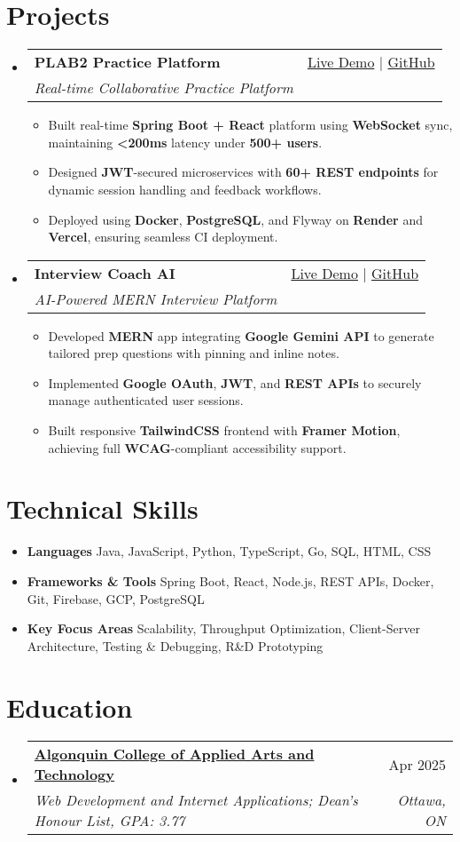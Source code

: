 \documentclass[letterpaper,11pt]{article}
\makeatletter
\newcommand{\resumeItem}[1]{\item\small{#1 \vspace{-2pt}}}
\newcommand{\resumeSubheading}[4]{
  \vspace{-1pt}\item
    \begin{tabular*}{0.97\textwidth}[t]{l@{\extracolsep{\fill}}r}
      \textbf{#1} & #2 \\
      \textit{\small#3} & \textit{\small #4} \\
    \end{tabular*}\vspace{-5pt}
}
\newcommand{\resumeSubHeadingListStart}{\begin{itemize}[leftmargin=*]}
\newcommand{\resumeSubHeadingListEnd}{\end{itemize}}
\newcommand{\resumeItemListStart}{\begin{itemize}}
\newcommand{\resumeItemListEnd}{\end{itemize}\vspace{-5pt}}
\makeatother
\begin{document}
\section{Projects}
  \resumeSubHeadingListStart
    \resumeSubheading
      {\textbf{PLAB2 Practice Platform}}{\href{https://plab2practice.com}{Live Demo} | \href{https://github.com/altansaid/plab2projectnew}{GitHub}}
      {Real-time Collaborative Practice Platform}{}
      \resumeItemListStart
        \resumeItem{Built real-time \textbf{Spring Boot + React} platform using \textbf{WebSocket} sync, maintaining \textbf{<200ms} latency under \textbf{500+ users}.}
        \resumeItem{Designed \textbf{JWT}-secured microservices with \textbf{60+ REST endpoints} for dynamic session handling and feedback workflows.}
        \resumeItem{Deployed using \textbf{Docker}, \textbf{PostgreSQL}, and Flyway on \textbf{Render} and \textbf{Vercel}, ensuring seamless CI deployment.}
      \resumeItemListEnd

    \resumeSubheading
      {\textbf{Interview Coach AI}}{\href{https://interviewcoach-ai.vercel.app/}{Live Demo} | \href{https://github.com/altansaid/interviewcoach-ai}{GitHub}}
      {AI-Powered MERN Interview Platform}{}
      \resumeItemListStart
        \resumeItem{Developed \textbf{MERN} app integrating \textbf{Google Gemini API} to generate tailored prep questions with pinning and inline notes.}
        \resumeItem{Implemented \textbf{Google OAuth}, \textbf{JWT}, and \textbf{REST APIs} to securely manage authenticated user sessions.}
        \resumeItem{Built responsive \textbf{TailwindCSS} frontend with \textbf{Framer Motion}, achieving full \textbf{WCAG}-compliant accessibility support.}
      \resumeItemListEnd

  \resumeSubHeadingListEnd

\section{Technical Skills}
  \resumeItemListStart
    \resumeItem{\textbf{Languages}}{Java, JavaScript, Python, TypeScript, Go, SQL, HTML, CSS}
    \resumeItem{\textbf{Frameworks \& Tools}}{Spring Boot, React, Node.js, REST APIs, Docker, Git, Firebase, GCP, PostgreSQL}
    \resumeItem{\textbf{Key Focus Areas}}{Scalability, Throughput Optimization, Client-Server Architecture, Testing \& Debugging, R\&D Prototyping}
  \resumeItemListEnd

\section{Education}
  \resumeSubHeadingListStart
    \resumeSubheading
      {\href{https://www.algonquincollege.com/sat/program/web-development-internet-applications/}{Algonquin College of Applied Arts and Technology}}{Apr 2025}
      {Web Development and Internet Applications; Dean's Honour List, GPA: 3.77}{Ottawa, ON}
  \resumeSubHeadingListEnd
\end{document}
